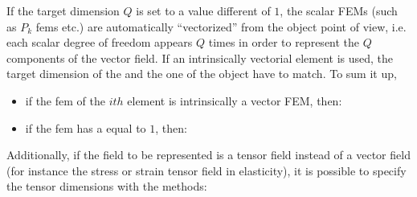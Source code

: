 \documentclass[a4paper,11pt,english]{sphinxmanual}
\begin{document}
If the target dimension \(Q\) is set to a value different of \(1\), the
scalar FEMs (such as \(P_k\) fems etc.) are automatically “vectorized” from
the  object point of view, i.e. each scalar degree of freedom appears \(Q\)
times in order to represent the \(Q\) components of the vector field. If an
intrinsically vectorial element is used, the target dimension of the  and
the one of the  object have to match. To sum it up,
\begin{itemize}
\item {} 
if the fem of the \(ith\) element is intrinsically a vector FEM, then:

\begin{sphinxVerbatim}[commandchars=\\\{\}]
  
  
\end{sphinxVerbatim}

\item {} 
if the fem has a  equal to \(1\), then:

\begin{sphinxVerbatim}[commandchars=\\\{\}]
  
\end{sphinxVerbatim}

\end{itemize}

Additionally, if the field to be represented is a tensor field instead of a vector field (for instance the stress or strain tensor field in elasticity), it is possible to specify the tensor dimensions with the methods:
\end{document}
